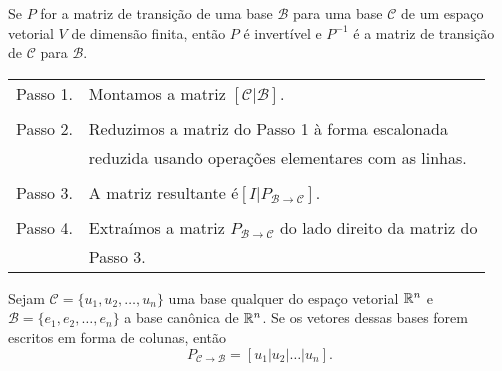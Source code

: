 \documentclass{beamer}
\begin{document}
\begin{frame}
	\begin{teorema}
		Se $P$ for a matriz de transição de uma base $\mathcal{B}$ para uma base $\mathcal{C}$ de um espaço vetorial $V$ de dimensão finita, então $P$ é invertível e $P^{-1}$ é a matriz de transição de $\mathcal{C}$ para $\mathcal{B}$.
	\end{teorema}
\end{frame}

\begin{frame}
	\begin{tcolorbox}[colback=green!30, colframe=green!80!blue, title=Procedimento para calcular $P_{\mathcal{B} \to \mathcal{C}}$]
			\begin{tabular}{ll}
				Passo 1. & Montamos a matriz $[\mathcal{C} | \mathcal{B}]$.\\
				\\
				Passo 2. & Reduzimos a matriz do Passo 1 à forma escalonada\\
				& reduzida usando operações elementares com as linhas.\\
				\\
				Passo 3. & A matriz resultante é$[I | P_{\mathcal{B} \to \mathcal{C}}]$.\\
				\\
				Passo 4. & Extraímos a matriz $P_{\mathcal{B} \to \mathcal{C}}$ do lado direito da matriz do\\
				& Passo 3.
			\end{tabular}
	\end{tcolorbox}
\end{frame}

\begin{frame}
	\begin{teorema}
		Sejam $\mathcal{C} = \{u_1, u_2, \dots, u_n\}$ uma base qualquer do espaço vetorial $\mathbb{R}^n$ e $\mathcal{B} = \{e_1, e_2, \dots, e_n\}$ a base canônica de $\mathbb{R}^n$. Se os vetores dessas bases forem escritos em forma de colunas, então
		\[
			P_{\mathcal{C} \to \mathcal{B}} = [u_1 | u_2 | \dots | u_n].
		\]
	\end{teorema}
\end{frame}
\end{document}
